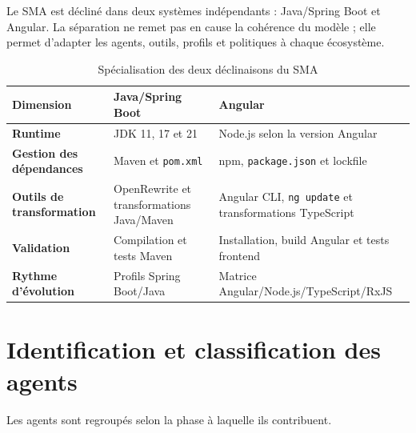 Le SMA est décliné dans deux systèmes indépendants : Java/Spring Boot et Angular. La séparation ne remet pas en cause la cohérence du modèle ; elle permet d'adapter les agents, outils, profils et politiques à chaque écosystème.

\begin{table}[H]
    \centering
    \small
    \begin{tabularx}{\textwidth}{|>{\bfseries\RaggedRight\arraybackslash}p{4.0cm}|>{\RaggedRight\arraybackslash}X|>{\RaggedRight\arraybackslash}X|}
        \hline
        \rowcolor{cgilight!95}
        \textbf{Dimension} & \textbf{Java/Spring Boot} & \textbf{Angular} \\
        \hline
        Runtime & JDK 11, 17 et 21 & Node.js selon la version Angular \\
        \hline
        Gestion des dépendances & Maven et \texttt{pom.xml} & npm, \texttt{package.json} et lockfile \\
        \hline
        Outils de transformation & OpenRewrite et transformations Java/Maven & Angular CLI, \texttt{ng update} et transformations TypeScript \\
        \hline
        Validation & Compilation et tests Maven & Installation, build Angular et tests frontend \\
        \hline
        Rythme d'évolution & Profils Spring Boot/Java & Matrice Angular/Node.js/TypeScript/RxJS \\
        \hline
    \end{tabularx}
    \caption{Spécialisation des deux déclinaisons du SMA}
    \label{tab:specialisation-sma-ch3}
\end{table}

\section{Identification et classification des agents}

Les agents sont regroupés selon la phase à laquelle ils contribuent.

